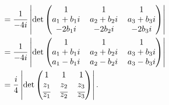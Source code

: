 \documentclass[9pt]{article}
\begin{document}
\begin{enumerate}
\begin{align*}
           &= \frac{1}{-4i}\left|\det\left(\begin{tabular}{@{}ccc@{}}
                  1 & 1 & 1 \\
                  $a_1+b_1i$ & $a_2+b_2i$ & $a_3+b_3i$ \\
                  $-2b_1i$ & $-2b_2i$ & $-2b_3i$
              \end{tabular}\right)\right| \\
           &= \frac{1}{-4i}\left|\det\left(\begin{tabular}{@{}ccc@{}}
                  1 & 1 & 1 \\
                  $a_1+b_1i$ & $a_2+b_2i$ & $a_3+b_3i$ \\
                  $a_1-b_1i$ & $a_2-b_2i$ & $a_3-b_3i$
              \end{tabular}\right)\right| \\
           &= \frac{i}{4}\left|\det\left(\begin{tabular}{@{}ccc@{}}
                  1 & 1 & 1 \\
                  $z_1$ & $z_2$ & $z_3$ \\
                  $\overline{z_1}$ & $\overline{z_2}$ & $\overline{z_3}$
              \end{tabular}\right)\right|.
      \end{align*}


\end{enumerate}
\end{document}
